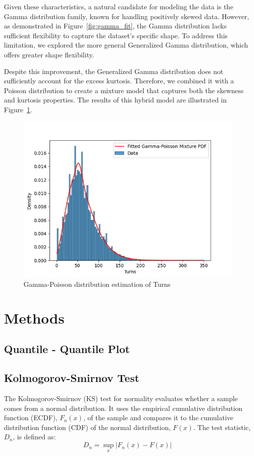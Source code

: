 \documentclass[conference]{IEEEtran}
\begin{document}
Given these characteristics, a natural candidate for modeling the data is the Gamma distribution family, known for handling positively skewed data. However, as demonstrated in Figure~\ref{fig:gamma_fit}, the Gamma distribution lacks sufficient flexibility to capture the dataset’s specific shape. To address this limitation, we explored the more general Generalized Gamma distribution, which offers greater shape flexibility.

Despite this improvement, the Generalized Gamma distribution does not sufficiently account for the excess kurtosis. Therefore, we combined it with a Poisson distribution to create a mixture model that captures both the skewness and kurtosis properties. The results of this hybrid model are illustrated in Figure~\ref{fig:gam_poi_fit}.



\begin{figure}[H]
    \centering
    \includegraphics[width=0.8\linewidth]{gamma_poisson_fit.png}
    \caption{Gamma-Poisson distribution estimation of Turns}
    \label{fig:gam_poi_fit}
\end{figure}

\section{Methods}
\subsection{Quantile - Quantile Plot}


\subsection{Kolmogorov-Smirnov Test}
The Kolmogorov-Smirnov (KS) test for normality evaluates whether a sample comes from a normal distribution. It uses the empirical cumulative distribution function (ECDF), $F_n(x)$, of the sample and compares it to the cumulative distribution function (CDF) of the normal distribution, $F(x)$. The test statistic, $D_n$, is defined as:
\[D_n = \sup_x |F_n(x) - F(x)|\]
\end{document}
